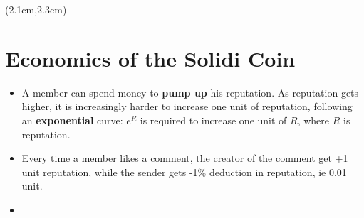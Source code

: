 \begin{preview}
\begin{textblock*}{5cm}(2.1cm,2.3cm) %
	{\color{red}{\large \textcircled{\small \themypage}}}
	\addtocounter{mypage}{1}
\end{textblock*}

\begin{minipage}{\textwidth}
	\setlength{\parskip}{0.4\baselineskip}

\section{Economics of the Solidi Coin}

\begin{itemize}
	\item A member can spend money to \textbf{pump up} his reputation.  As reputation gets higher, it is increasingly harder to increase one unit of reputation, following an \textbf{exponential} curve: $e^R$ is required to increase one unit of $R$, where $R$ is reputation.
	\item Every time a member likes a comment, the creator of the comment get +1 unit reputation, while the sender gets -1\% deduction in reputation, ie 0.01 unit.
	\item
\end{itemize}

\end{minipage}
\end{preview}

